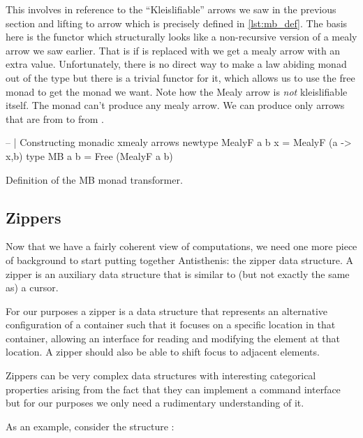 This involves  in reference to the ``Kleislifiable''
arrows we saw in the previous section and lifting to 
arrow which is precisely defined in \ref{lst:mb_def}. The basis here
is the functor  which structurally looks like a
non-recursive version of a mealy arrow we saw earlier. That is if
 is replaced with  we get a mealy arrow
with an extra value. Unfortunately, there is no direct way to make a
law abiding monad out of the  type but there is a trivial
functor for it, which allows us to use the free monad
\cite{voigtlanderAsymptoticImprovementComputations2008} to get the
monad we want. Note how the Mealy arrow is \emph{not} kleislifiable
itself. The  monad can't produce any mealy arrow. We
can produce only arrows that are from  to  from
.

\begin{code}
\begin{haskellcode}
-- | Constructing monadic xmealy arrows
newtype MealyF a b x = MealyF (a -> x,b)
type MB a b = Free (MealyF a b)
\end{haskellcode}
  \caption{\label{lst:mb_def}Definition of the MB monad transformer.}
\end{code}


\subsection{Zippers}

Now that we have a fairly coherent view of computations, we need one
more piece of background to start putting together Antisthenis: the
zipper data structure. A zipper \cite{huetZipper1997} is an auxiliary
data structure that is similar to (but not exactly the same as) a
cursor.

For our purposes a zipper is a data structure that represents an
alternative configuration of a container such that it focuses on a
specific location in that container, allowing an interface for reading
and modifying the element at that location. A zipper should also be
able to shift focus to adjacent elements.

Zippers can be very complex data structures with interesting
categorical properties arising from the fact that they can implement a
command interface \cite{uustaluComonadicFunctionalAttribute2005} but
for our purposes we only need a rudimentary understanding of it.

As an example, consider the structure :


